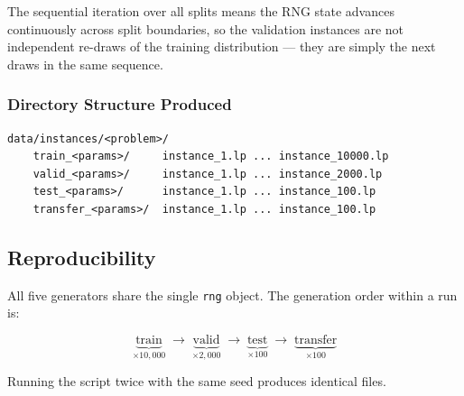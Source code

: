The sequential iteration over all splits means the RNG state advances continuously across split boundaries, so the validation instances are not independent re-draws of the training distribution --- they are simply the next draws in the same sequence.

\subsubsection{Directory Structure Produced}

\begin{lstlisting}
data/instances/<problem>/
    train_<params>/     instance_1.lp ... instance_10000.lp
    valid_<params>/     instance_1.lp ... instance_2000.lp
    test_<params>/      instance_1.lp ... instance_100.lp
    transfer_<params>/  instance_1.lp ... instance_100.lp
\end{lstlisting}

\subsection{Reproducibility}

All five generators share the single \texttt{rng} object. The generation order within a run is:

\[
\underbrace{\text{train}}_{\times 10{,}000} \;\to\;
\underbrace{\text{valid}}_{\times 2{,}000} \;\to\;
\underbrace{\text{test}}_{\times 100} \;\to\;
\underbrace{\text{transfer}}_{\times 100}
\]

Running the script twice with the same seed produces identical files.
